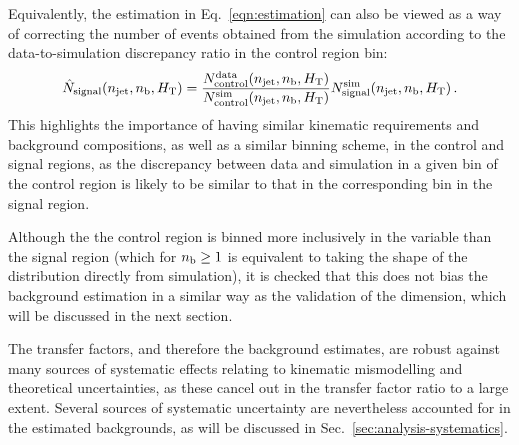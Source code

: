 
Equivalently, the estimation in Eq.~\ref{eqn:estimation} can also be viewed as 
a way of correcting the number of events obtained from the simulation according 
to the data-to-simulation discrepancy ratio in the control region bin:
\begin{equation}
\hat{N}_\mathrm{signal}(n_{\text{jet}}, n_{\text{b}}, \mbox{$H_\text{T}$}) = 
\frac{N_\mathrm{control}^\mathrm{data}(n_{\text{jet}}, n_{\text{b}}, \mbox{$H_\text{T}$})}{N_\mathrm{control}^\mathrm{sim}(n_{\text{jet}}, n_{\text{b}}, \mbox{$H_\text{T}$})}
N_\mathrm{signal}^\mathrm{sim}(n_{\text{jet}}, n_{\text{b}}, \mbox{$H_\text{T}$}) \, .
\end{equation}
This highlights the importance of having similar kinematic requirements and 
background compositions, as well as a similar binning scheme, in the control 
and signal regions, as the discrepancy between data and simulation in a given 
bin of the control region is likely to be similar to that in the corresponding 
bin in the signal region.

Although the the \mmj control region is binned more inclusively in the \nb 
variable than the signal region (which for $n_{\text{b}} \ge 1$ is equivalent to taking 
the shape of the \nb distribution directly from simulation), it is checked that 
this does not bias the background estimation in a similar way as the validation 
of the \mht dimension, which will be discussed in the next section.

The transfer factors, and therefore the background estimates, are robust 
against many sources of systematic effects relating to kinematic mismodelling 
and theoretical uncertainties, 
as these cancel out in the transfer factor ratio to a large extent.
Several sources of systematic uncertainty are nevertheless accounted for in the 
estimated backgrounds, as will be discussed in 
Sec.~\ref{sec:analysis-systematics}.

